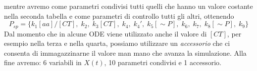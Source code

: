 \documentclass[11pt]{article}
\begin{document}
mentre avremo come parametri condivisi tutti quelli che hanno un valore costante nella seconda tabella e come parametri di controllo tutti gli altri, ottenendo 
\begin{equation*}
    P_{sp} = \{k_1[aa]/[CT],\;k_2,\;k_3[CT],\;k_4,\;k_4',\;k_5[\sim P],\;k_6,\;k_7,\;k_8[\sim P],\;k_9\}
\end{equation*}
Dal momento che in alcune ODE viene utilizzato anche il valore di $[CT]$, per esempio nella terza e nella quarta, possiamo utilizzare un \textit{accessorio} che ci consenta di immagazzinarne il valore man mano che avanza la simulazione. Alla fine avremo: 6 variabili in $X(t)$, 10 parametri condivisi e 1 accessorio.
\end{document}
